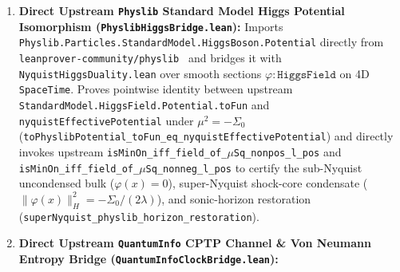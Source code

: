 \documentclass[11pt,a4paper]{article}
\theoremstyle{definition}
\begin{document}
\begin{enumerate}
\item \textbf{Direct Upstream \texttt{Physlib} Standard Model Higgs Potential Isomorphism (\texttt{Physlib\allowbreak{}Higgs\allowbreak{}Bridge.lean}):}
Imports \texttt{Physlib.\allowbreak{}Particles.\allowbreak{}StandardModel.\allowbreak{}HiggsBoson.\allowbreak{}Potential} directly from \texttt{leanprover-\allowbreak{}community/\allowbreak{}physlib}~\cite{tooby2024} and bridges it with \texttt{Nyquist\allowbreak{}Higgs\allowbreak{}Duality.lean} over smooth sections $\varphi : \texttt{HiggsField}$ on 4D \texttt{SpaceTime}. Proves pointwise identity between upstream \texttt{StandardModel.\allowbreak{}HiggsField.\allowbreak{}Potential.\allowbreak{}toFun} and \texttt{nyquist\allowbreak{}Effective\allowbreak{}Potential} under $\mu^2 = -\Sigma_0$ (\texttt{toPhyslibPotential\_\allowbreak{}toFun\_\allowbreak{}eq\_\allowbreak{}nyquistEffectivePotential}) and directly invokes upstream \texttt{isMinOn\_\allowbreak{}iff\_\allowbreak{}field\_\allowbreak{}of\_\allowbreak{}$\mu$Sq\_\allowbreak{}nonpos\_\allowbreak{}l\_\allowbreak{}pos} and \texttt{isMinOn\_\allowbreak{}iff\_\allowbreak{}field\_\allowbreak{}of\_\allowbreak{}$\mu$Sq\_\allowbreak{}nonneg\_\allowbreak{}l\_\allowbreak{}pos} to certify the sub-Nyquist uncondensed bulk ($\varphi(x) = 0$), super-Nyquist shock-core condensate ($\|\varphi(x)\|_H^2 = -\Sigma_0 / (2\lambda)$), and sonic-horizon restoration (\texttt{superNyquist\_\allowbreak{}physlib\_\allowbreak{}horizon\_\allowbreak{}restoration}).
\item \textbf{Direct Upstream \texttt{QuantumInfo} CPTP Channel \& Von Neumann Entropy Bridge (\texttt{QuantumInfo\allowbreak{}Clock\allowbreak{}Bridge.lean}):}

\end{enumerate}
\end{document}
